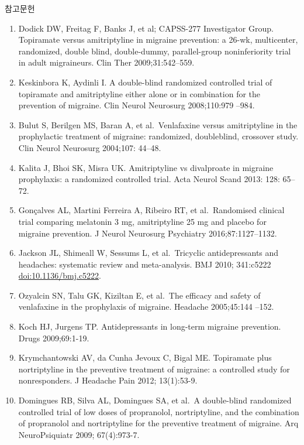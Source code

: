 \documentclass[]{book}
\begin{document}
참고문헌

\begin{enumerate}
\def\labelenumi{\arabic{enumi}.}
\item
  Dodick DW, Freitag F, Banks J, et al; CAPSS-277 Investigator Group. Topiramate versus amitriptyline in migraine prevention: a 26-wk, multicenter, randomized, double blind, double-dummy, parallel-group noninferiority trial in adult migraineurs. Clin Ther 2009;31:542--559.
\item
  Keskinbora K, Aydinli I. A double-blind randomized controlled trial of topiramate and amitriptyline either alone or in combination for the prevention of migraine. Clin Neurol Neurosurg 2008;110:979 --984.
\item
  Bulut S, Berilgen MS, Baran A, et al.~Venlafaxine versus amitriptyline in the prophylactic treatment of migraine: randomized, doubleblind, crossover study. Clin Neurol Neurosurg 2004;107: 44--48.
\item
  Kalita J, Bhoi SK, Misra UK. Amitriptyline vs divalproate in migraine prophylaxis: a randomized controlled trial. Acta Neurol Scand 2013: 128: 65--72.
\item
  Gonçalves AL, Martini Ferreira A, Ribeiro RT, et al.~Randomised clinical trial comparing melatonin 3 mg, amitriptyline 25 mg and placebo for migraine prevention. J Neurol Neurosurg Psychiatry 2016;87:1127--1132.
\item
  Jackson JL, Shimeall W, Sessums L, et al.~Tricyclic antidepressants and headaches: systematic review and meta-analysis. BMJ 2010; 341:c5222 \url{doi:10.1136/bmj.c5222}.
\item
  Ozyalcin SN, Talu GK, Kiziltan E, et al.~The efficacy and safety of venlafaxine in the prophylaxis of migraine. Headache 2005;45:144 --152.
\item
  Koch HJ, Jurgens TP. Antidepressants in long-term migraine prevention. Drugs 2009;69:1-19.
\item
  Krymchantowski AV, da Cunha Jevoux C, Bigal ME. Topiramate plus nortriptyline in the preventive treatment of migraine: a controlled study for nonresponders. J Headache Pain 2012; 13(1):53-9.
\item
  Domingues RB, Silva AL, Domingues SA, et al.~A double-blind randomized controlled trial of low doses of propranolol, nortriptyline, and the combination of propranolol and nortriptyline for the preventive treatment of migraine. Arq NeuroPsiquiatr 2009; 67(4):973-7.
\end{enumerate}
\end{document}
